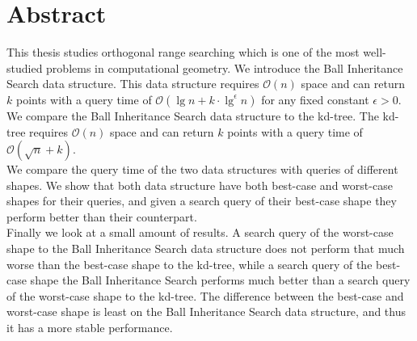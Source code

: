 \documentclass[twoside,11pt,openright]{report}
\begin{document}
\pagestyle{empty} 
\vspace*{\fill}
\clearpage


\pagestyle{plain}
\chapter*{Abstract}

This thesis studies orthogonal range searching which is one of the most well-studied problems in computational geometry. We introduce the Ball Inheritance Search data structure. This data structure requires $\mathcal{O}(n)$ space and can return $k$ points with a query time of $\mathcal{O}(\lg n + k\cdot\lg^\epsilon n)$ for any fixed constant $\epsilon > 0$. We compare the Ball Inheritance Search data structure to the kd-tree. The kd-tree requires $\mathcal{O}(n)$ space and can return $k$ points with a query time of $\mathcal{O}(\sqrt{n} + k)$.\\

We compare the query time of the two data structures with queries of different shapes. We show that both data structure have both best-case and worst-case shapes for their queries, and given a search query of their best-case shape they perform better than their counterpart.\\

Finally we look at a small amount of results. A search query of the worst-case shape to the Ball Inheritance Search data structure does not perform that much worse than the best-case shape to the kd-tree, while a search query of the best-case shape the Ball Inheritance Search performs much better than a search query of the worst-case shape to the kd-tree. The difference between the best-case and worst-case shape is least on the Ball Inheritance Search data structure, and thus it has a more stable performance.
\end{document}
